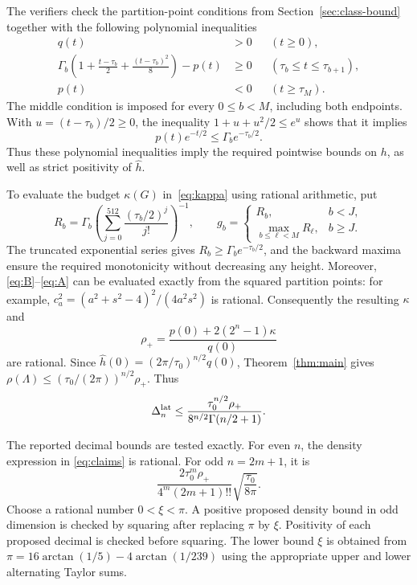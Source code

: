 \documentclass[11pt]{article}
\newcommand{\kap}{\kappa}
\begin{document}
The verifiers check the partition-point conditions from Section~\ref{sec:class-bound} together with the following polynomial inequalities
\begin{align}
 q(t)&>0&& (t\ge0),\nonumber\\
 \Gamma_b\left(1+\frac{t-\tau_b}{2}+\frac{(t-\tau_b)^2}{8}\right)-p(t)&\ge0
 &&(\tau_b\le t\le\tau_{b+1}),\label{eq:checks}\\
 p(t)&<0&&(t\ge\tau_M).\nonumber
\end{align}
The middle condition is imposed for every $0\le b<M$, including both
endpoints. With $u=(t-\tau_b)/2\ge0$, the inequality
$1+u+u^2/2\le e^u$ shows that it implies
\[
 p(t)e^{-t/2}\le\Gamma_b e^{-\tau_b/2}.
\]
Thus these polynomial inequalities imply the required pointwise bounds
on $h$, as well as strict positivity of $\widehat h$.

To evaluate the budget $\kap(G)$ in~\eqref{eq:kappa} using rational arithmetic, put
\[
 R_b=\Gamma_b\left(\sum_{j=0}^{512}
                  \frac{(\tau_b/2)^j}{j!}\right)^{-1},\qquad
 g_b=\begin{cases}
 R_b,&b<J,\\
 \max_{b\le\ell<M}R_\ell,&b\ge J.
 \end{cases}
\]
The truncated exponential series gives
$R_b\ge\Gamma_be^{-\tau_b/2}$, and the backward maxima ensure the
required monotonicity without decreasing any height. Moreover,
\eqref{eq:B}--\eqref{eq:A} can be evaluated exactly from the squared
partition points: for example,
$c_a^2=(a^2+s^2-4)^2/(4a^2s^2)$ is rational. Consequently the resulting
$\kap$ and
\[
 \rho_+=\frac{p(0)+2(2^n-1)\kap}{q(0)}
\]
are rational. Since $\widehat h(0)=(2\pi/\tau_0)^{n/2}q(0)$,
Theorem~\ref{thm:main} gives
$\rho(\Lambda)\le(\tau_0/(2\pi))^{n/2}\rho_+$. Thus
\begin{equation}\label{eq:claims}
 \Delta_n^{\rm lat}\le
 \frac{\tau_0^{n/2}\rho_+}{8^{n/2}\Gamma(n/2+1)}.
\end{equation}

The reported decimal bounds are tested exactly. For even $n$, the
density expression in \eqref{eq:claims} is rational. For odd $n=2m+1$,
it is
\[
 \frac{2\tau_0^m\rho_+}{4^m(2m+1)!!}
       \sqrt{\frac{\tau_0}{8\pi}}.
\]
Choose a rational number $0<\xi<\pi$. A positive proposed
density bound in odd dimension is checked by squaring after replacing
$\pi$ by $\xi$. Positivity of each proposed decimal is checked before
squaring. The lower bound $\xi$ is
obtained from $\pi=16\arctan(1/5)-4\arctan(1/239)$ using the appropriate
upper and lower alternating Taylor sums.
\end{document}
